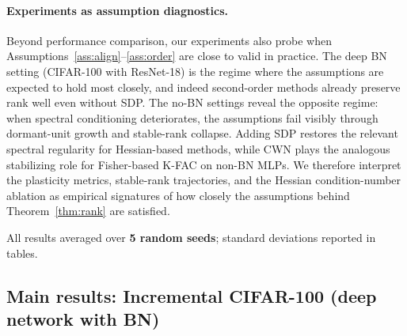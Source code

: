 \documentclass{article}
\begin{document}
\paragraph{Experiments as assumption diagnostics.}
Beyond performance comparison, our experiments also probe when Assumptions~\ref{ass:align}--\ref{ass:order} are close to valid in practice. The deep BN setting (CIFAR-100 with ResNet-18) is the regime where the assumptions are expected to hold most closely, and indeed second-order methods already preserve rank well even without SDP. The no-BN settings reveal the opposite regime: when spectral conditioning deteriorates, the assumptions fail visibly through dormant-unit growth and stable-rank collapse. Adding SDP restores the relevant spectral regularity for Hessian-based methods, while CWN plays the analogous stabilizing role for Fisher-based K-FAC on non-BN MLPs. We therefore interpret the plasticity metrics, stable-rank trajectories, and the Hessian condition-number ablation as empirical signatures of how closely the assumptions behind Theorem~\ref{thm:rank} are satisfied.

All results averaged over \textbf{5 random seeds}; standard deviations reported in tables.

\subsection{Main results: Incremental CIFAR-100 (deep network with BN)}
\end{document}
